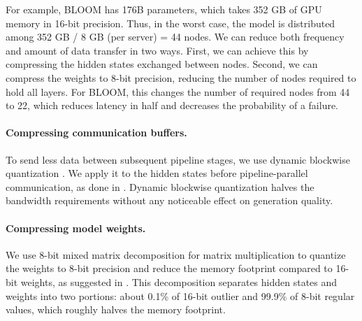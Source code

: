 For example, BLOOM has 176B parameters, which takes 352 GB of GPU memory in 16-bit precision. Thus, in the worst case, the model is distributed among 352 GB / 8 GB (per server) = 44 nodes. We can reduce both frequency and amount of data transfer in two ways.
First, we can achieve this by compressing the hidden states exchanged between nodes. Second, we can compress the weights to 8-bit precision, reducing the number of nodes required to hold all layers. For BLOOM, this changes the number of required nodes from 44 to 22, which reduces latency in half and decreases the probability of a failure.

\paragraph{Compressing communication buffers.} To send less data between subsequent pipeline stages, we use dynamic blockwise quantization \citep{dettmers2022optimizers}. We apply it to the hidden states before pipeline-parallel communication, as done in \citet{ryabinin2021swarm}. Dynamic blockwise quantization halves the bandwidth requirements without any noticeable effect on generation quality.

\paragraph{Compressing model weights.} We use 8-bit mixed matrix decomposition for matrix multiplication to quantize the weights to 8-bit precision and reduce the memory footprint compared to 16-bit weights, as suggested in \citep{dettmers2022llm}. This decomposition separates hidden states and weights into two portions: about 0.1\% of 16-bit outlier and 99.9\% of 8-bit regular values, which roughly halves the memory footprint.


